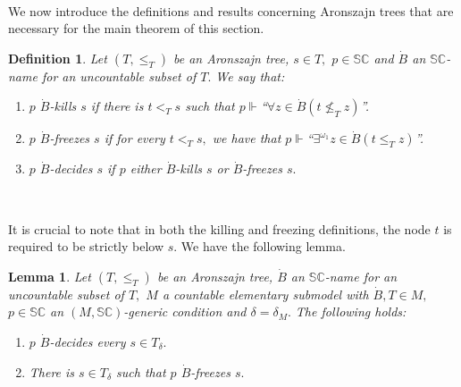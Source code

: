 \documentclass{article}
\newtheorem{definition}[theorem]{Definition}
\newtheorem{lemma}[theorem]{Lemma}
\begin{document}
\qquad\ \qquad\ \ \ \qquad\ \ \ \ 

We now introduce the definitions and results concerning Aronszajn trees that
are necessary for the main theorem of this section.

\begin{definition}
Let $\left(  T,\leq_{T}\right)  $ be an Aronszajn tree, $s\in T,$
$p\in\mathbb{SC}$ and $\dot{B}$ an $\mathbb{SC}$-name for an uncountable
subset of $T.$ We say that:

\begin{enumerate}
\item $p$ $\dot{B}$\emph{-kills }$s$ if there is $t<_{T}s$ such that $p\Vdash
$\textquotedblleft$\forall z\in\dot{B}\left(  t\nleq_{T}z\right)
$\textquotedblright.

\item $p$ $\dot{B}$\emph{-freezes }$s$ if for every $t<_{T}s,$ we have that
$p\Vdash$\textquotedblleft$\exists^{\omega_{1}}z\in\dot{B}\left(  t\leq
_{T}z\right)  $\textquotedblright.

\item $p$ $\dot{B}$\emph{-decides }$s$ if $p$ either $\dot{B}$-kills $s$ or
$\dot{B}$-freezes $s.$
\end{enumerate}
\end{definition}

\qquad\ \ \ \qquad\ \ \ \ \ 

It is crucial to note that in both the killing and freezing definitions, the
node $t$ is required to be strictly below $s.$ We have the following lemma.

\begin{lemma}
Let $\left(  T,\leq_{T}\right)  $ be an Aronszajn tree, $\dot{B}$ an
$\mathbb{SC}$-name for an uncountable subset of $T,$ $M$ a countable
elementary submodel with $\dot{B},T\in M,$ $p\in\mathbb{SC}$ an
$(M,\mathbb{SC})$-generic condition and $\delta=\delta_{M}.$ The following
holds: \label{Lema SC decide y congela}

\begin{enumerate}
\item $p$ $\dot{B}$-decides every $s\in T_{\delta}.$

\item There is $s\in T_{\delta}$ such that $p$ $\dot{B}$-freezes $s.$
\end{enumerate}
\end{lemma}
\end{document}
